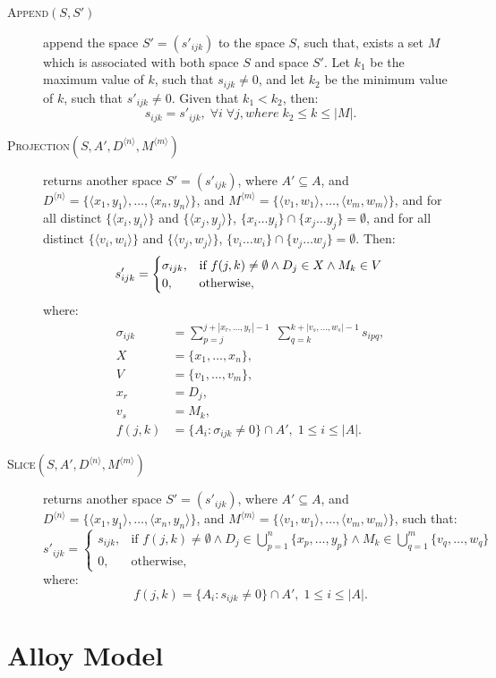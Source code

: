 \documentclass{article}
\begin{document}
\begin{description}
	\item[\textsc{Append}$(S,S')$] append the space
	$S'=\left(s'_{ijk}\right)$ to the space $S$,
		such that, exists a set $M$ which is associated with both space $S$ and
		space $S'$. Let $k_1$ be the maximum value of $k$, such that
		$s_{ijk} \neq 0$, and let $k_2$ be the minimum value of $k$,
		such that $s'_{ijk} \neq 0$. Given that $k_1 < k_2$, then:
		\[
			s_{ijk} = s'_{ijk}, \; \forall i \; \forall j, where \; k_2 \leq k \leq |M|.
		\]

	\item[\textsc{Projection}$(S, A', D^{\langle n \rangle}, M^{\langle m \rangle})$] 
		returns another space $S'=\left(s'_{ijk}\right)$,
		where $A' \subseteq A$, and $D^{\langle n \rangle} = 
		\{\langle x_1, y_1 \rangle, \ldots, \langle x_n, y_n \rangle\}$, and
		$M^{\langle m \rangle} = 
		\{\langle v_1, w_1 \rangle, \ldots, \langle v_m, w_m \rangle \}$, and
		for all distinct $\{\langle x_i, y_i \rangle\}$ and $\{\langle x_j, y_j \rangle\}$,
		$\{x_i \ldots y_i\} \cap \{x_j \ldots y_j\} = \emptyset$, and
		for all distinct $\{\langle v_i, w_i \rangle\}$ and $\{\langle v_j, w_j \rangle\}$,
		$\{v_i \ldots w_i\} \cap \{v_j \ldots w_j\} = \emptyset$. Then:
		\[
			s'_{ijk} = 
			\begin{cases}
				\sigma_{ijk}, & 
					\text{if } f(j, k) \neq \emptyset \land 
						D_j \in X \land M_k \in V \\
				0, & \text{otherwise},
			\end{cases} \\
		\]
		where:
		\begin{align*}
			\sigma_{ijk} &= \sum_{p=j}^{j+|x_r, \ldots, y_r|-1} \;
				{\sum_{q=k}^{k+|v_s, \ldots, w_s|-1}{s_{ipq}}}, \\
			X &= \{ x_1, \ldots, x_n \}, \\
			V &= \{ v_1, \ldots, v_m \}, \\
			x_r &= D_j, \\
			v_s &= M_k, \\
			f(j,k) &= \{ A_i : \sigma_{ijk} \neq 0 \} \cap A', \; 1 \leq i \leq |A|.
		\end{align*}

	\item[\textsc{Slice}$(S, A', D^{\langle n \rangle}, M^{\langle m \rangle})$] 
		returns another space $S'=\left(s'_{ijk}\right)$, 
		where $A' \subseteq A $, and $D^{\langle n \rangle} = 
		\{\langle x_1, y_1 \rangle, \ldots, \langle x_n, y_n \rangle\}$, and
		$M^{\langle m \rangle} = 
		\{\langle v_1, w_1 \rangle, \ldots, \langle v_m, w_m \rangle \}$,
		such that:
		\[
			s'_{ijk} = 
			\begin{cases}
				s_{ijk}, & \text{if } 
					f(j, k) \neq \emptyset \land
					D_j \in \bigcup\limits_{p=1}^{n} \{ x_p, \ldots, y_p \} \land 
					M_k \in \bigcup\limits_{q=1}^{m} \{ v_q, \ldots, w_q \} \\
				0, & \text{otherwise},
			\end{cases}
		\]
		where:
		\[
			f(j,k) = \{ A_i : s_{ijk} \neq 0 \} \cap A', \; 1 \leq i \leq |A|.
		\]

\end{description}

\section{Alloy Model} %
\label{sec:alloy_model}


\end{document}
